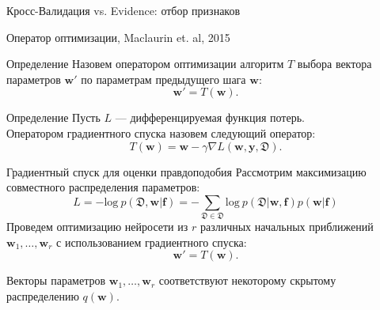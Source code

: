 \documentclass[10pt,pdf,utf8,russian,aspectratio=169]{beamer}
\begin{document}
\begin{frame}{Кросс-Валидация vs. Evidence: отбор признаков}
\begin{figure}
  \centering
\label{fig:1}\qquad

\end{figure}
\end{frame}

\begin{frame}{Оператор оптимизации, Maclaurin et. al, 2015}
\begin{block}{Определение}
Назовем оператором оптимизации алгоритм $T$ выбора вектора параметров $\mathbf{w}'$  по параметрам предыдущего шага $\mathbf{w}$:
\[
	\mathbf{w}' = T(\mathbf{w}).
\]
\end{block}

\begin{block}{Определение}
Пусть $L$ --- дифференцируемая функция потерь. \\
Оператором градиентного спуска назовем следующий оператор:
\[
    T(\mathbf{w}) = \mathbf{w} - \gamma \nabla L(\mathbf{w}, \mathbf{y}, \mathfrak{D}).
\]
\end{block}


\end{frame}

\begin{frame}{Градиентный спуск для оценки правдоподобия}
Рассмотрим максимизацию совместного распределения параметров:
\[
    L =  -\text{log}~p(\mathfrak{D},\mathbf{w}|\mathbf{f}) = -\sum_{\mathfrak{D} \in \mathfrak{D}} \text{log}~p(\mathfrak{D}|\mathbf{w}, \mathbf{f}) p(\mathbf{w}|\mathbf{f})
\]
Проведем оптимизацию нейросети  из $r$ различных начальных приближений $\mathbf{w}_1, \dots, \mathbf{w}_r$ с использованием градиентного спуска:
\[
\mathbf{w}' = T(\mathbf{w}).
\]

Векторы параметров $\mathbf{w}_1,\dots,\mathbf{w}_r$ соответствуют некоторому скрытому распределению $q(\mathbf{w})$.

\end{frame}
\end{document}
